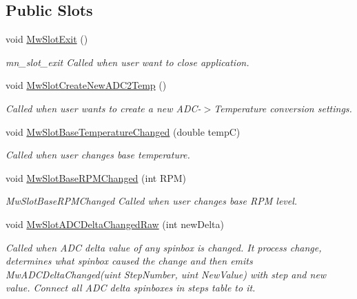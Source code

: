 \subsection*{Public Slots}
\begin{DoxyCompactItemize}
\item 
\mbox{\label{class_main_window_a95fb3a2c4f9240d386029d5ffebab1ac}} 
void \hyperlink{class_main_window_a95fb3a2c4f9240d386029d5ffebab1ac}{Mw\+Slot\+Exit} ()
\begin{DoxyCompactList}\small\item\em mn\+\_\+slot\+\_\+exit Called when user want to close application. \end{DoxyCompactList}\item 
\mbox{\label{class_main_window_a2ef62a3653289364eace9bbf334d904b}} 
void \hyperlink{class_main_window_a2ef62a3653289364eace9bbf334d904b}{Mw\+Slot\+Create\+New\+A\+D\+C2\+Temp} ()
\begin{DoxyCompactList}\small\item\em Called when user wants to create a new A\+D\+C-\/$>$Temperature conversion settings. \end{DoxyCompactList}\item 
void \hyperlink{class_main_window_a0a690287dffb47b6477f2fb50c2a818e}{Mw\+Slot\+Base\+Temperature\+Changed} (double tempC)
\begin{DoxyCompactList}\small\item\em Called when user changes base temperature. \end{DoxyCompactList}\item 
void \hyperlink{class_main_window_aaf5b44955c0c93824ea89edd3cdc5730}{Mw\+Slot\+Base\+R\+P\+M\+Changed} (int R\+PM)
\begin{DoxyCompactList}\small\item\em Mw\+Slot\+Base\+R\+P\+M\+Changed Called when user changes base R\+PM level. \end{DoxyCompactList}\item 
void \hyperlink{class_main_window_acbdfd3592779f6946c4fecc33c79e9a4}{Mw\+Slot\+A\+D\+C\+Delta\+Changed\+Raw} (int new\+Delta)
\begin{DoxyCompactList}\small\item\em Called when A\+DC delta value of any spinbox is changed. It process change, determines what spinbox caused the change and then emits Mw\+A\+D\+C\+Delta\+Changed(uint Step\+Number, uint New\+Value) with step and new value. Connect all A\+DC delta spinboxes in steps table to it. \end{DoxyCompactList}\item 

\end{DoxyCompactItemize}
